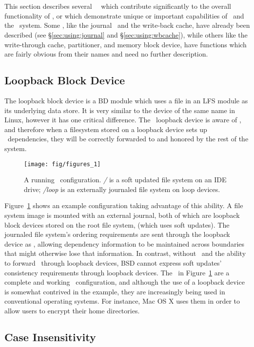 \section{\Modules}
\label{sec:modules}

This section describes several \Kudos\ \modules\ which contribute significantly
to the overall functionality of \Kudos, or which demonstrate unique or
important capabilities of \chdescs\ and the \module\ system. Some \modules,
like the journal \module\ and the write-back cache, have already been described
(see \S\ref{sec:using:journal} and \S\ref{sec:using:wbcache}), while others
like the write-through cache, partitioner, and memory block device, have
functions which are fairly obvious from their names and need no further
description.





\subsection{Loopback Block Device}
\label{sec:modules:loop}

The loopback block device is a BD module which uses a file in an LFS module as
its underlying data store. It is very similar to the device of the same name in
Linux, however it has one critical difference. The \Kudos\ loopback device is
aware of \chdescs, and therefore when a filesystem stored on a loopback device
sets up \chdesc\ dependencies, they will be correctly forwarded to and honored
by the rest of the system.

\begin{figure}[htb]
  \centering
  \texttt{[image: fig/figures\_1]}
  \caption{A running \Kudos\ configuration. {\it/} is a soft updated
    file system on an IDE drive; {\it/loop} is an externally journaled
    file system on loop devices.}
  \label{fig:kfs-graph}
\end{figure}

Figure~\ref{fig:kfs-graph} shows an example configuration taking advantage of
this ability. A file system image is mounted with an external journal, both of
which are loopback block devices stored on the root file system, (which uses
soft updates). The journaled file system's ordering requirements are sent
through the loopback device as \chdescs, allowing dependency information to be
maintained across boundaries that might otherwise lose that information. In
contrast, without \chdescs\ and the ability to forward \chdescs\ through
loopback devices, BSD cannot express soft updates' consistency requirements
through loopback devices. The \modules\ in Figure~\ref{fig:kfs-graph} are a
complete and working \Kudos\ configuration, and although the use of a loopback
device is somewhat contrived in the example, they are increasingly being used in
conventional operating systems. For instance, Mac OS X uses them in order to
allow users to encrypt their home directories.



\subsection{Case Insensitivity}
\label{sec:modules:icase}

